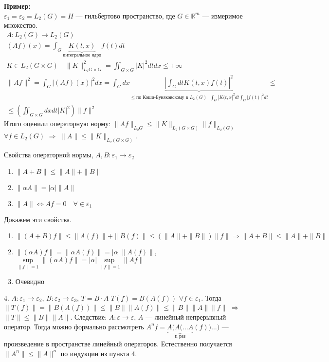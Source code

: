 \documentclass[12pt]{article}
\begin{document}
\textbf{Пример:}\\
$\varepsilon_1 = \varepsilon_2 = L_2(G) = H$ --- гильбертово пространство, где $G \in \mathbb R^m$ --- измеримое множество.
\begin{gather*}
    A : L_2(G) \to L_2(G)\\
    (Af)(x) = \int_G \underbrace{K(t, x)}_{\text{интегральное ядро}} f(t) dt\\
    K \in L_2(G \times G) \quad \|K\|^2_{L_2{G \times G}} = \iint_{G \times G} |K|^2 dt dx \le +\infty\\
    \|Af\|^2 = \int_{G} |(Af)(x)|^2 dx = \int_G dx  \underbrace{\left| \int_G dt K(t, x) f(t) \right|^2}_{\le\text{по Коши-Буняковскому в }L_2(G)\text{ }
    \int_G |K(t, x|^2 dt \int_G |f(t)|^2 dt}\le\\
    \le \left(\iint_{G \times G} dx dt |K|^2 \right)\|f\|^2
\end{gather*}
Итого оценили операторную норму: $\|Af\|_{L_2{G}} \le \|K\|_{L_2(G \times G)}\|f\|_{L_2(G)}$
$\forall f \in L_2(G)$ $\Rightarrow$ $\boxed{\|A\| \le \|K\|_{L_2(G \times G)}}$.

Свойства операторной нормы, $A, B : \varepsilon_1 \to \varepsilon_2$
\begin{enumerate}
    \item{$\|A + B\| \le \|A\| + \|B\|$}
    \item{$\|\alpha A\| = |\alpha| \|A\|$}
    \item{$\|A\| \Leftrightarrow Af = 0 \quad \forall \in \varepsilon_1$}
\end{enumerate}
Докажем эти свойства.
\begin{enumerate}
    \item{$\|(A + B)f\| \le \|A(f)\| + \|B(f)\| \le (\|A\| + \|B\|)\|f\| \Rightarrow \|A + B\| \le \|A\| + \|B\|$}
    \item{$\|(\alpha A)f\| = \|\alpha A(f)\| = |\alpha| \|A(f)\|$, $\sup \limits_{\|f\| = 1} \|(\alpha A)f\| = |\alpha| \sup \limits_{\|f\| = 1} \|Af\|$}
    \item{Очевидно}
\end{enumerate}
4. $A : \varepsilon_1 \to \varepsilon_2$, $B : \varepsilon_2 \to \varepsilon_3$, $T = B \cdot A$ $T(f) = B(A(f))$ $\forall f \in \varepsilon_1$.
Тогда $\|T(f)\| = \|B(A(f))\| \le \|B\|\|A(f)\| \le \|B\|\|A\|\|f\|$ $\Rightarrow$ $\boxed{\|T\| \le \|B\|\|A\|}$.
Следствие: $A : \varepsilon \to \varepsilon$, $A$ --- линейный непрерывный оператор.
Тогда можно формально рассмотреть $A^n f = \underbrace{A(A(\dots A}_{\text{n раз}}(f)) \dots )$ --- произведение в пространстве линейный операторов.
Естественно получается $\|A^n\| \le \|A\|^n$ по индукции из пункта 4.
\end{document}
